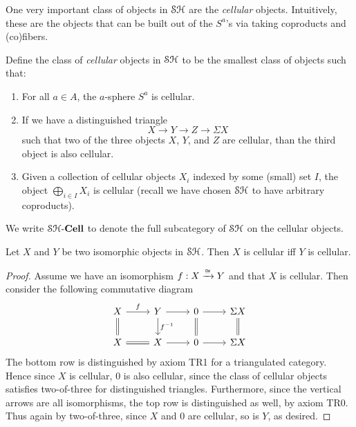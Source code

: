 \documentclass[../main.tex]{subfiles}
\begin{document}
One very important class of objects in $\mathcal{SH}$ are the \emph{cellular} objects. Intuitively, these are the objects that can be built out of the $S^a$'s via taking coproducts and (co)fibers.

\begin{definition}\label{cellular}
	Define the class of \emph{cellular} objects in $\mathcal{SH}$ to be the smallest class of objects such that:
	\begin{enumerate}
		\item For all $a\in A$, the $a$-sphere $S^a$ is cellular.
		\item If we have a distinguished triangle
		\[X\to Y\to Z\to\Sigma X\]
		such that two of the three objects $X$, $Y$, and $Z$ are cellular, than the third object is also cellular.
		\item Given a collection of cellular objects $X_i$ indexed by some (small) set $I$, the object $\bigoplus_{i\in I} X_i$ is cellular (recall we have chosen $\mathcal{SH}$ to have arbitrary coproducts).
	\end{enumerate}
	We write $\mathcal{SH}\text-\mathbf{Cell}$ to denote the full subcategory of $\mathcal{SH}$ on the cellular objects.
\end{definition}

\begin{lemma}\label{cellular_closed_under_iso}
	Let $X$ and $Y$ be two isomorphic objects in $\mathcal{SH}$. Then $X$ is cellular iff $Y$ is cellular.
\end{lemma}
\begin{proof}
	Assume we have an isomorphism $f:X\xrightarrow\cong Y$ and that $X$ is cellular. Then consider the following commutative diagram
	\[\begin{tikzcd}
		X & Y & 0 & {\Sigma X} \\
		X & X & 0 & {\Sigma X}
		\arrow["f", from=1-1, to=1-2]
		\arrow[from=1-2, to=1-3]
		\arrow[from=1-3, to=1-4]
		\arrow["{f^{-1}}", from=1-2, to=2-2]
		\arrow[Rightarrow, no head, from=1-1, to=2-1]
		\arrow[Rightarrow, no head, from=2-1, to=2-2]
		\arrow[from=2-2, to=2-3]
		\arrow[from=2-3, to=2-4]
		\arrow[Rightarrow, no head, from=1-4, to=2-4]
		\arrow[Rightarrow, no head, from=1-3, to=2-3]
	\end{tikzcd}\]
	The bottom row is distinguished by axiom TR1 for a triangulated category. Hence since $X$ is cellular, $0$ is also cellular, since the class of cellular objects satisfies two-of-three for distinguished triangles. Furthermore, since the vertical arrows are all isomorphisms, the top row is distinguished as well, by axiom TR0. Thus again by two-of-three, since $X$ and $0$ are cellular, so is $Y$, as desired.
\end{proof}
\end{document}
